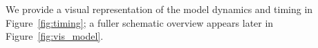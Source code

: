 We provide a visual representation of the model dynamics and timing in Figure~\ref{fig:timing}; a fuller schematic overview appears later in Figure~\ref{fig:vis_model}.
